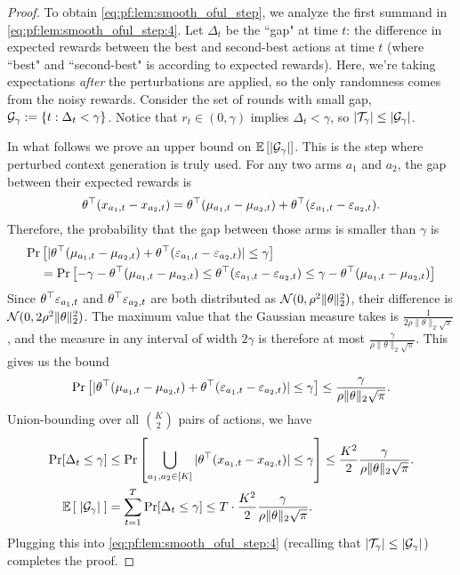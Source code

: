\begin{proof}
To obtain \eqref{eq:pf:lem:smooth_oful_step}, we analyze the first summand in \eqref{eq:pf:lem:smooth_oful_step:4}. Let $\Delta_t$ be the ``gap" at time $t$: the difference in expected rewards
  between the best and second-best actions at time $t$ (where ``best" and
  ``second-best" is according to expected rewards). Here, we're taking
  expectations \emph{after} the perturbations are applied, so the only
  randomness comes from the noisy rewards. Consider the set of rounds with small gap,
  $\mathcal{G}_\gamma := \{t : \Delta_t < \gamma\}$.
  Notice that $r_t \in (0, \gamma)$ implies $\Delta_t <\gamma$, so
    $|\mathcal{T}_\gamma| \le |\mathcal{G}_\gamma|$.

In what follows we prove an upper bound on $\mathbb{E}\left[|\mathcal{G}_\gamma|\right]$. This is the step where perturbed context generation is truly used. For any two arms $a_1$ and $a_2$, the gap between their expected
  rewards is
  \[
    \theta^{\top}(x_{a_1,t} - x_{a_2,t}) = \theta^{\top}(\mu_{a_1,t} -
    \mu_{a_2,t}) + \theta^{\top}(\varepsilon_{a_1,t} - \varepsilon_{a_2,t}).
  \]
  Therefore, the probability that the gap between those arms is smaller than
  $\gamma$ is
  \begin{align*}
    \Pr&\left[|\theta^{\top}(\mu_{a_1,t} -
    \mu_{a_2,t}) + \theta^{\top}(\varepsilon_{a_1,t} - \varepsilon_{a_2,t})| \le
    \gamma\right] \\
    &= \Pr\left[-\gamma - \theta^{\top}(\mu_{a_1,t} - \mu_{a_2,t}) \le
    \theta^{\top}(\varepsilon_{a_1,t} - \varepsilon_{a_2,t}) \le \gamma -
    \theta^{\top}(\mu_{a_1,t} - \mu_{a_2,t})\right]
  \end{align*}
  Since $\theta^{\top}\varepsilon_{a_1,t}$ and $\theta^{\top}\varepsilon_{a_2,t}$
  are both distributed as $\mathcal{N}(0, \rho^2 \|\theta\|_2^2)$, their difference is
  $\mathcal{N}(0, 2 \rho^2 \|\theta\|_2^2)$. The maximum value that the Gaussian
  measure takes is $\frac{1}{2\rho\|\theta\|_2\sqrt{\pi}}$, and the measure in
  any interval of width $2\gamma$ is therefore at most
  $\frac{\gamma}{\rho\|\theta\|_2\sqrt{\pi}}$. This gives us the bound
  \[
    \Pr\left[|\theta^{\top}(\mu_{a_1,t} - \mu_{a_2,t}) +
    \theta^{\top}(\varepsilon_{a_1,t} - \varepsilon_{a_2,t})| \le \gamma\right] \le
    \frac{\gamma}{\rho\|\theta\|_2\sqrt{\pi}}.
  \]
  Union-bounding over all $\binom{K}{2}$ pairs of actions, we have
\begin{align*}
\Pr[\Delta_t \le \gamma]
    &\le \Pr\left[\bigcup_{a_1, a_2 \in [K]}
          |\theta^{\top}(x_{a_1,t} - x_{a_2,t})| \le \gamma\right]
    \le \frac{K^2}{2} \frac{\gamma}{\rho\|\theta\|_2\sqrt{\pi}}.\\
\mathbb{E}\left[\;|\mathcal{G}_\gamma|\;\right]
    &= \sum_{t=1}^T \Pr[\Delta_t \le \gamma]
    \le T \cdot \frac{K^2}{2} \frac{\gamma}{\rho\|\theta\|_2\sqrt{\pi}}.
\end{align*}
Plugging this into \eqref{eq:pf:lem:smooth_oful_step:4}
  (recalling that
    $|\mathcal{T}_\gamma| \le |\mathcal{G}_\gamma|$)
  completes the proof.
\end{proof}

